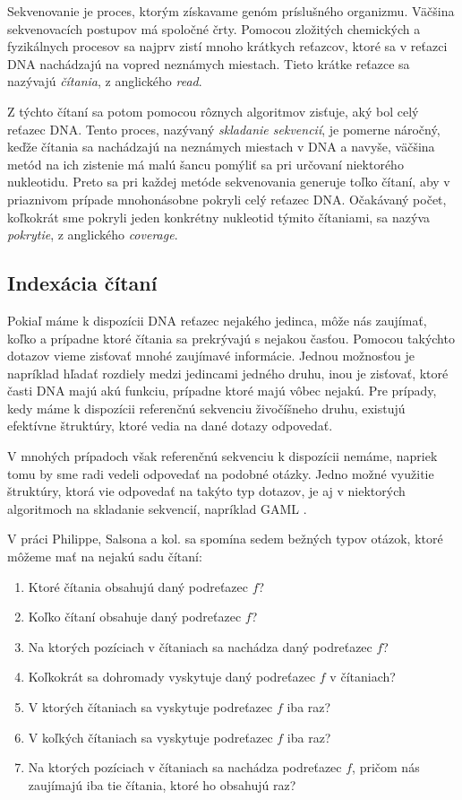 Sekvenovanie je proces, ktorým získavame genóm príslušného organizmu.
Väčšina sekvenovacích postupov má spoločné črty. Pomocou zložitých chemických
a fyzikálnych procesov sa najprv zistí mnoho krátkych reťazcov, ktoré sa
v reťazci DNA nachádzajú na vopred neznámych miestach. Tieto krátke reťazce
sa nazývajú \emph{čítania}, z anglického \emph{read}.

Z týchto čítaní sa potom pomocou rôznych algoritmov zisťuje, aký bol celý reťazec DNA.
Tento proces, nazývaný \emph{skladanie sekvencií}, je pomerne náročný, keďže čítania sa nachádzajú na neznámych miestach
v DNA a navyše, väčšina metód na ich zistenie má malú šancu pomýliť sa pri určovaní
niektorého nukleotidu. Preto sa pri každej metóde sekvenovania generuje toľko čítaní, aby
v priaznivom prípade mnohonásobne pokryli celý reťazec DNA. Očakávaný počet, koľkokrát
sme pokryli jeden konkrétny nukleotid týmito čítaniami, sa nazýva \emph{pokrytie},
z anglického \emph{coverage}.

\subsection{Indexácia čítaní}

Pokiaľ máme k dispozícii DNA reťazec nejakého jedinca, môže nás zaujímať, koľko a prípadne
ktoré čítania sa prekrývajú s nejakou časťou. Pomocou takýchto dotazov vieme zisťovať
mnohé zaujímavé informácie. Jednou možnosťou je napríklad hľadať rozdiely medzi
jedincami jedného druhu, inou je zisťovať, ktoré časti DNA majú akú funkciu, prípadne
ktoré majú vôbec nejakú. Pre prípady, kedy máme k dispozícii referenčnú sekvenciu živočíšneho
druhu, existujú efektívne štruktúry, ktoré vedia na dané dotazy odpovedať.

V mnohých prípadoch však referenčnú sekvenciu k dispozícii nemáme, napriek tomu by sme
radi vedeli odpovedať na podobné otázky. Jedno možné využitie štruktúry, ktorá vie
odpovedať na takýto typ dotazov, je aj v niektorých algoritmoch na
skladanie sekvencií, napríklad GAML \cite{gaml}.

V práci Philippe, Salsona a kol. \cite{gk_arrays} sa spomína sedem bežných typov otázok,
ktoré môžeme mať na nejakú sadu čítaní:

\begin{enumerate}
    \item Ktoré čítania obsahujú daný podreťazec $f$?
    \item Koľko čítaní obsahuje daný podreťazec $f$?
    \item Na ktorých pozíciach v čítaniach sa nachádza daný podreťazec $f$?
    \item Koľkokrát sa dohromady vyskytuje daný podreťazec $f$ v čítaniach?
    \item V ktorých čítaniach sa vyskytuje podreťazec $f$ iba raz?
    \item V koľkých čítaniach sa vyskytuje podreťazec $f$ iba raz?
    \item Na ktorých pozíciach v čítaniach sa nachádza podreťazec $f$, pričom nás
    zaujímajú iba tie čítania, ktoré ho obsahujú raz?
\end{enumerate}

